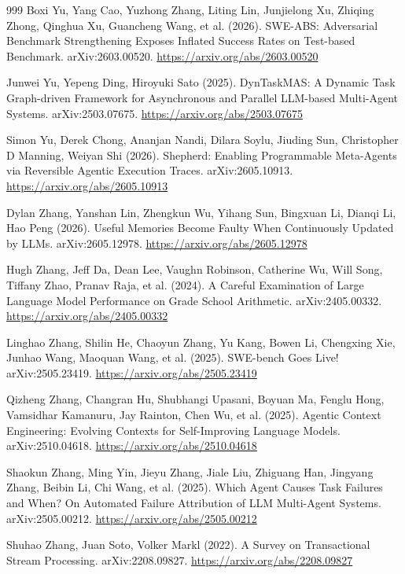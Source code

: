\begin{thebibliography}{999}
 Boxi Yu, Yang Cao, Yuzhong Zhang, Liting Lin, Junjielong Xu, Zhiqing Zhong, Qinghua Xu, Guancheng Wang, et al. (2026). SWE-ABS: Adversarial Benchmark Strengthening Exposes Inflated Success Rates on Test-based Benchmark. arXiv:2603.00520. \url{https://arxiv.org/abs/2603.00520}

 Junwei Yu, Yepeng Ding, Hiroyuki Sato (2025). DynTaskMAS: A Dynamic Task Graph-driven Framework for Asynchronous and Parallel LLM-based Multi-Agent Systems. arXiv:2503.07675. \url{https://arxiv.org/abs/2503.07675}

 Simon Yu, Derek Chong, Ananjan Nandi, Dilara Soylu, Jiuding Sun, Christopher D Manning, Weiyan Shi (2026). Shepherd: Enabling Programmable Meta-Agents via Reversible Agentic Execution Traces. arXiv:2605.10913. \url{https://arxiv.org/abs/2605.10913}

 Dylan Zhang, Yanshan Lin, Zhengkun Wu, Yihang Sun, Bingxuan Li, Dianqi Li, Hao Peng (2026). Useful Memories Become Faulty When Continuously Updated by LLMs. arXiv:2605.12978. \url{https://arxiv.org/abs/2605.12978}

 Hugh Zhang, Jeff Da, Dean Lee, Vaughn Robinson, Catherine Wu, Will Song, Tiffany Zhao, Pranav Raja, et al. (2024). A Careful Examination of Large Language Model Performance on Grade School Arithmetic. arXiv:2405.00332. \url{https://arxiv.org/abs/2405.00332}

 Linghao Zhang, Shilin He, Chaoyun Zhang, Yu Kang, Bowen Li, Chengxing Xie, Junhao Wang, Maoquan Wang, et al. (2025). SWE-bench Goes Live! arXiv:2505.23419. \url{https://arxiv.org/abs/2505.23419}

 Qizheng Zhang, Changran Hu, Shubhangi Upasani, Boyuan Ma, Fenglu Hong, Vamsidhar Kamanuru, Jay Rainton, Chen Wu, et al. (2025). Agentic Context Engineering: Evolving Contexts for Self-Improving Language Models. arXiv:2510.04618. \url{https://arxiv.org/abs/2510.04618}

 Shaokun Zhang, Ming Yin, Jieyu Zhang, Jiale Liu, Zhiguang Han, Jingyang Zhang, Beibin Li, Chi Wang, et al. (2025). Which Agent Causes Task Failures and When? On Automated Failure Attribution of LLM Multi-Agent Systems. arXiv:2505.00212. \url{https://arxiv.org/abs/2505.00212}

 Shuhao Zhang, Juan Soto, Volker Markl (2022). A Survey on Transactional Stream Processing. arXiv:2208.09827. \url{https://arxiv.org/abs/2208.09827}


\end{thebibliography}
